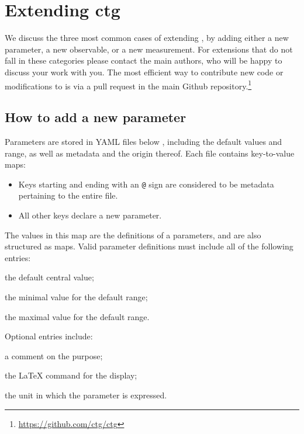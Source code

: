 \chapter{Extending ctg}
\label{ch:extending}

We discuss the three most common cases of extending \ctg, by adding either
a new parameter, a new observable, or a new measurement.
For extensions that do not fall in these categories please contact the main authors, who will be
happy to discuss your work with you. The most efficient way to contribute new code
or modifications to \ctg is via a pull request in the main Github repository.\footnote{
    \url{https://github.com/ctg/ctg}
}

\section{How to add a new parameter}
\label{sec:extending:parameter}

Parameters are stored in YAML files below , including the default values and range,
as well as metadata and the origin thereof. Each file contains key-to-value maps:
\begin{itemize}
    \item Keys starting and ending with an \texttt{@} sign are considered to be metadata pertaining
    to the entire file.

    \item All other keys declare a new parameter.
\end{itemize}
The values in this map are the definitions of a parameters, and are also structured as maps. Valid
parameter definitions must include all of the following entries:
\begin{description}[labelwidth=.15\textwidth]
    \item[central] the default central value;
    \item[min]     the minimal value for the default range;
    \item[max]     the maximal value for the default range.
\end{description}
Optional entries include:
\begin{description}[labelwidth=.15\textwidth]
    \item[comment] a comment on the purpose;
    \item[latex]   the LaTeX command for the display;
    \item[unit]    the unit in which the parameter is expressed.
\end{description}

